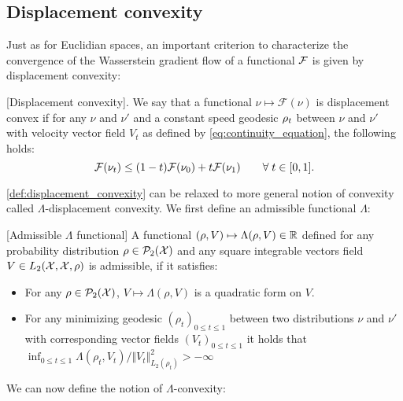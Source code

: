 \subsection{Displacement convexity}\label{subsec:lambda_convexity}
Just as for Euclidian spaces, an  important criterion to characterize the convergence of the Wasserstein gradient flow of a functional ${{\mathcal F}}$ is given by displacement convexity:
\begin{definition}\label{def:displacement_convexity}[Displacement convexity]. 
We say that a functional $\nu\mapsto\mathcal{F}(\nu)$ is displacement convex
	if for any $\nu$ and $\nu'$ and a constant speed geodesic $\text{\ensuremath{\rho_{t}}}$
	between $\nu$ and $\nu'$ with velocity vector field $V_{t}$ as defined by \cref{eq:continuity_equation},
	the following holds:
	\begin{equation}\label{eq:lambda_displacement_convex}
		{{\mathcal F}}(\nu_{t})\leq(1-t){{\mathcal F}}(\nu_{0})+t{{\mathcal F}}(\nu_{1}) \qquad\forall\; t\in[0,1].
	\end{equation}
\end{definition}
\cref{def:displacement_convexity} can be relaxed to more general notion of convexity called $\Lambda$-displacement convexity. We first define an admissible functional $\Lambda$:
\begin{definition}\label{def:conditions_lambda}[Admissible $\Lambda$ functional]
	A functional $(\rho,V)\mapsto \Lambda(\rho,V) \in {{\mathbb R}}$  defined for any probability distribution $\rho\in \mathcal{P}_2({{\mathcal X}})$ and any square integrable vectors field $V\in L_2({{\mathcal X}},{{\mathcal X}},\rho)$ is admissible, if it satisfies:
	\begin{itemize}
	\item For any $\rho \in \mathcal{P}_2({{\mathcal X}})$,  $V\mapsto \Lambda(\rho,V)$ is a quadratic form on $V$.
	\item For any minimizing geodesic $(\rho_t)_{0\leq t\leq 1}$ between two distributions $\nu$ and $\nu'$ with corresponding vector fields $(V_t)_{0\leq t\leq 1}$ it holds that $\inf_{0\leq t\leq 1}\Lambda(\rho_t,V_t)/\Vert V_t\Vert_{L_{2}(\rho_t)}^{2}>-\infty$ 
\end{itemize}
\end{definition}
We can now define the notion of $\Lambda$-convexity:
